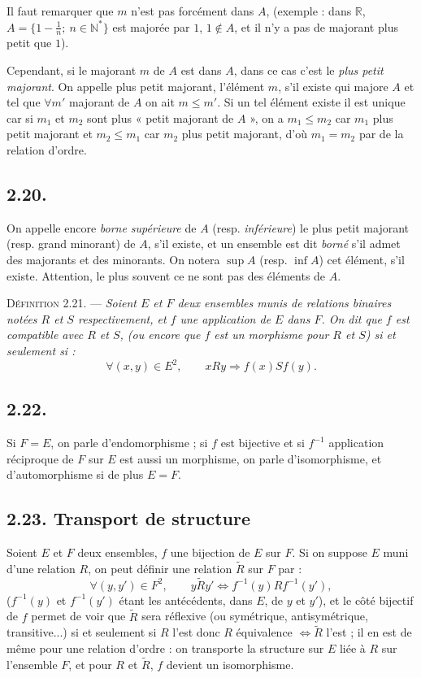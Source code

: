 Il faut remarquer que $m$ n'est pas forcément dans $A$, (exemple : dans $\mathbb R$, $A=\{1-\frac1n;\ n\in\mathbb N^*\}$ est majorée par $1$, $1\notin A$, et il n'y a pas de majorant plus petit que $1$).

Cependant, si le majorant $m$ de $A$ est dans $A$, dans ce cas c'est le \emph{plus petit majorant}. On appelle plus petit majorant, l'élément $m$, s'il existe qui majore $A$ et tel que $\forall m'$ majorant de $A$ on ait $m\le m'$. Si un tel élément existe il est unique car si $m_1$ et $m_2$ sont plus « petit majorant de $A$ », on a $m_1\le m_2$ car $m_1$ plus petit majorant et $m_2\le m_1$ car $m_2$ plus petit majorant, d'où $m_1=m_2$ par  de la relation d'ordre. \bookend

\subsection*{2.20.}
On appelle encore \emph{borne supérieure} de $A$ (resp. \emph{inférieure}) le plus petit majorant (resp. grand minorant) de $A$, s'il existe, et un ensemble est dit \emph{borné} s'il admet des majorants et des minorants. On notera $\sup A$ (resp. $\inf A$) cet élément, s'il existe. Attention, le plus souvent ce ne sont pas des éléments de $A$.


\medskip\noindent\textsc{Définition 2.21.} --- \emph{Soient $E$ et $F$ deux ensembles munis de relations binaires notées $R$ et $S$ respectivement, et $f$ une application de $E$ dans $F$. On dit que $f$ est compatible avec $R$ et $S$, (ou encore que $f$ est un morphisme pour $R$ et $S$) si et seulement si :}
\[
\forall(x,y)\in E^2,\qquad xRy\Rightarrow f(x)Sf(y).
\]

\subsection*{2.22.}
Si $F=E$, on parle d'endomorphisme ; si $f$ est bijective et si $f^{-1}$ application réciproque de $F$ sur $E$ est aussi un morphisme, on parle d'isomorphisme, et d'automorphisme si de plus $E=F$.

\subsection*{2.23. Transport de structure}
Soient $E$ et $F$ deux ensembles, $f$ une bijection de $E$ sur $F$. Si on suppose $E$ muni d'une relation $R$, on peut définir une relation $\widetilde R$ sur $F$ par :
\[
\forall(y,y')\in F^2,\qquad y\widetilde R y'\Leftrightarrow f^{-1}(y)R f^{-1}(y'),
\]
($f^{-1}(y)$ et $f^{-1}(y')$ étant les antécédents, dans $E$, de $y$ et $y'$), et le côté bijectif de $f$ permet de voir que $\widetilde R$ sera réflexive (ou symétrique, antisymétrique, transitive...) si et seulement si $R$ l'est donc $R$ équivalence $\Leftrightarrow\widetilde R$ l'est ; il en est de même pour une relation d'ordre : on transporte la structure sur $E$ liée à $R$ sur l'ensemble $F$, et pour $R$ et $\widetilde R$, $f$ devient un isomorphisme. \bookend

